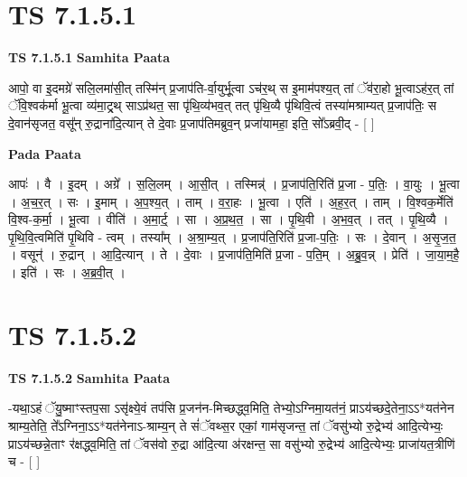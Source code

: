 \documentclass[17pt]{extarticle}
\begin{document}
\section*{ TS 7.1.5.1 }

\textbf{TS 7.1.5.1 } \newline
\textbf{Samhita Paata} \newline

आपो॒ वा इ॒दमग्रे॑ सलि॒लमा॑सी॒त् तस्मि॑न् प्र॒जाप॑ति-र्वा॒युर्भू॒त्वा ऽच॑र॒थ् स इ॒माम॑पश्य॒त् तां ॅव॑रा॒हो भू॒त्वाऽह॑र॒त् तां ॅवि॒श्वक॑र्मा भू॒त्वा व्य॑मा॒ट्र्थ् साऽप्र॑थत॒ सा पृ॑थि॒व्य॑भव॒त् तत् पृ॑थि॒व्यै पृ॑थिवि॒त्वं तस्या॑मश्राम्यत् प्र॒जाप॑तिः॒ स दे॒वान॑सृजत॒ वसू᳚न् रु॒द्राना॑दि॒त्यान् ते दे॒वाः प्र॒जाप॑तिमब्रुव॒न् प्रजा॑यामहा॒ इति॒ सो᳚ऽब्रवी॒द् - [  ] \newline

\textbf{Pada Paata} \newline

आपः॑ । वै । इ॒दम् । अग्रे᳚ । स॒लि॒लम् । आ॒सी॒त् । तस्मिन्न्॑ । प्र॒जाप॑ति॒रिति॑ प्र॒जा - प॒तिः॒ । वा॒युः । भू॒त्वा । अ॒च॒र॒त् । सः । इ॒माम् । अ॒प॒श्य॒त् । ताम् । व॒रा॒हः । भू॒त्वा । एति॑ । अ॒ह॒र॒त् । ताम् । वि॒श्वक॒र्मेति॑ वि॒श्व-क॒र्मा॒ । भू॒त्वा । वीति॑ । अ॒मा॒र्ट्॒ । सा । अ॒प्र॒थ॒त॒ । सा । पृ॒थि॒वी । अ॒भ॒व॒त् । तत् । पृ॒थि॒व्यै । पृ॒थि॒वि॒त्वमिति॑ पृ॒थिवि - त्वम् । तस्या᳚म् । अ॒श्रा॒म्य॒त् । प्र॒जाप॑ति॒रिति॑ प्र॒जा-प॒तिः॒ । सः । दे॒वान् । अ॒सृ॒ज॒त॒ । वसून्॑ । रु॒द्रान् । आ॒दि॒त्यान् । ते । दे॒वाः । प्र॒जाप॑ति॒मिति॑ प्र॒जा - प॒ति॒म् । अ॒ब्रु॒व॒न्न् । प्रेति॑ । जा॒या॒म॒है॒ । इति॑ । सः । अ॒ब्र॒वी॒त् ।  \newline




\section*{ TS 7.1.5.2 }

\textbf{TS 7.1.5.2 } \newline
\textbf{Samhita Paata} \newline

-यथा॒ऽहं ॅयु॒ष्माꣳस्तप॒सा ऽसृ॑क्ष्ये॒वं तप॑सि प्र॒जन॑न-मिच्छद्ध्व॒मिति॒ तेभ्यो॒ऽग्निमा॒यत॑नं॒ प्राऽय॑च्छदे॒तेना॒ऽऽ*यत॑नेन श्राम्य॒तेति॒ ते᳚ऽग्निना॒ऽऽ*यत॑नेनाऽ-श्राम्य॒न् ते सं॑ॅवथ्स॒र एकां॒ गाम॑सृजन्त॒ तां ॅवसु॑भ्यो रु॒द्रेभ्य॑ आदि॒त्येभ्यः॒ प्राऽय॑च्छन्ने॒ताꣳ र॑क्षद्ध्व॒मिति॒ तां ॅवस॑वो रु॒द्रा आ॑दि॒त्या अ॑रक्षन्त॒ सा वसु॑भ्यो रु॒द्रेभ्य॑ आदि॒त्येभ्यः॒ प्राजा॑यत॒त्रीणि॑ च - [  ] \newline
\end{document}
